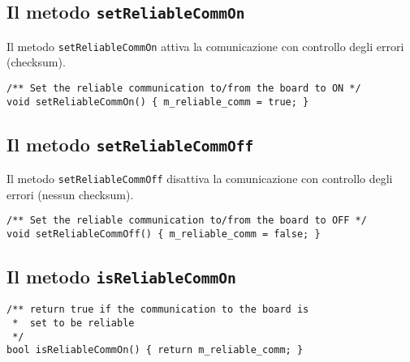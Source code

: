 \subsection{Il metodo \texttt{setReliableCommOn}}
Il metodo \texttt{setReliableCommOn} attiva la comunicazione con 
controllo degli errori (checksum).
\lstset{language=C++}
\begin{lstlisting}[caption={Dichiarazione del metodo \texttt{setReliableCommOn}},
label=lst:setReliableCommOn,mathescape]
/** Set the reliable communication to/from the board to ON */
void setReliableCommOn() { m_reliable_comm = true; }
\end{lstlisting}
\lstset{numbers=none}


\subsection{Il metodo \texttt{setReliableCommOff}}
Il metodo \texttt{setReliableCommOff} disattiva la 
comunicazione con controllo degli errori (nessun checksum).
\lstset{language=C++}
\begin{lstlisting}[caption={Dichiarazione del metodo \texttt{setReliableCommOff}},
label=lst:setReliableCommOff,mathescape]
/** Set the reliable communication to/from the board to OFF */
void setReliableCommOff() { m_reliable_comm = false; }
\end{lstlisting}
\lstset{numbers=none}


\subsection{Il metodo \texttt{isReliableCommOn}}
\lstset{language=C++}
\begin{lstlisting}[caption={Dichiarazione del metodo \texttt{isReliableCommOn}},
label=lst:isReliableCommOn,mathescape]
/** return true if the communication to the board is 
 *  set to be reliable 
 */
bool isReliableCommOn() { return m_reliable_comm; }
\end{lstlisting}
\lstset{numbers=none}


